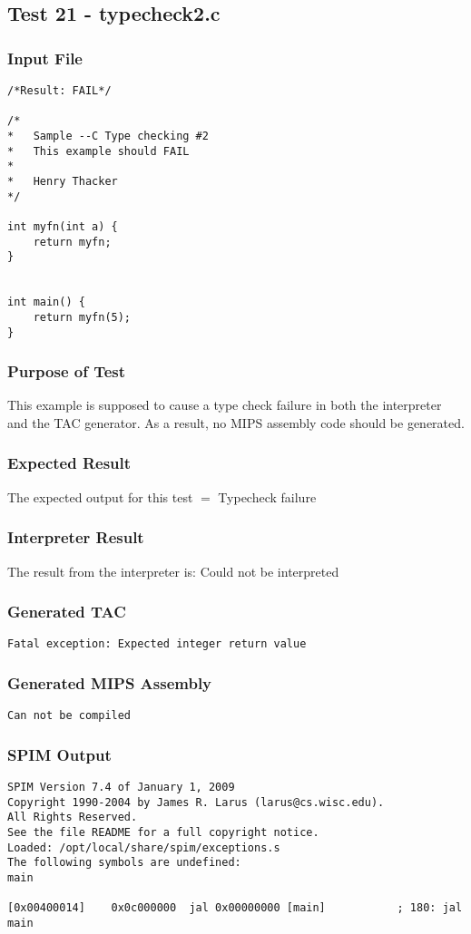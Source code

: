\subsection{Test 21 - typecheck2.c}
\subsubsection{Input File}
\begin{lstlisting}[showstringspaces=false,breaklines=true,backgroundcolor=\color{light-gray}, captionpos=b]
/*Result: FAIL*/

/*
*	Sample --C Type checking #2
*	This example should FAIL
*
*	Henry Thacker
*/

int myfn(int a) {
	return myfn;
}


int main() {
	return myfn(5);
}
\end{lstlisting}\subsubsection{Purpose of Test}
This example is supposed to cause a type check failure in both the interpreter and the TAC generator. As a result, no MIPS assembly code should be generated.
\subsubsection{Expected Result}
The expected output for this test $=$ Typecheck failure
\subsubsection{Interpreter Result}
The result from the interpreter is: Could not be interpreted
\subsubsection{Generated TAC}
\begin{lstlisting}[showstringspaces=false,breaklines=true,backgroundcolor=\color{light-gray}, captionpos=b]
Fatal exception: Expected integer return value

\end{lstlisting}\subsubsection{Generated MIPS Assembly}
\begin{lstlisting}[showstringspaces=false,breaklines=true,backgroundcolor=\color{light-gray}, captionpos=b]
Can not be compiled
\end{lstlisting}\subsubsection{SPIM Output}
\begin{verbatim}
SPIM Version 7.4 of January 1, 2009
Copyright 1990-2004 by James R. Larus (larus@cs.wisc.edu).
All Rights Reserved.
See the file README for a full copyright notice.
Loaded: /opt/local/share/spim/exceptions.s
The following symbols are undefined:
main

[0x00400014]	0x0c000000  jal 0x00000000 [main]           ; 180: jal main
\end{verbatim}
